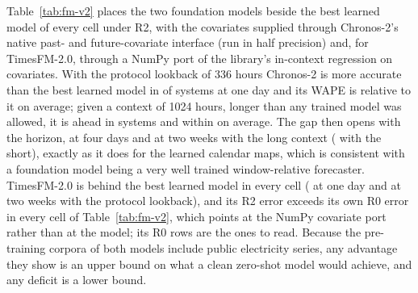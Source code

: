 Table~\ref{tab:fm-v2} places the two foundation models beside the best learned model of every
cell under R2, with the covariates supplied through Chronos-2's native past- and
future-covariate interface (run in half precision) and, for TimesFM-2.0, through a NumPy port
of the library's in-context regression on covariates. With the protocol lookback of 336 hours
Chronos-2 is more accurate than the best learned model in
 of  systems at one day
and its WAPE is  relative to it on average;
given a context of 1024 hours, longer than any trained model was allowed, it is ahead in
 systems and within
 on average. The gap then opens with the
horizon,  at four days and
 at two weeks with the long context
( with the short), exactly as it does for the
learned calendar maps, which is consistent with a foundation model being a very well trained
window-relative forecaster. TimesFM-2.0 is behind the best learned model in every cell
( at one day and
 at two weeks with the protocol lookback), and
its R2 error exceeds its own R0 error in every cell of Table~\ref{tab:fm-v2}, which points at
the NumPy covariate port rather than at the model; its R0 rows are the ones to read.
Because the pre-training corpora of both models include public electricity series, any
advantage they show is an upper bound on what a clean zero-shot model would achieve, and any
deficit is a lower bound.

